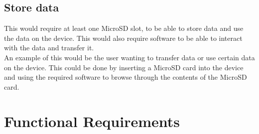 \subsection{Store data}
	This would require at least one MicroSD slot, to be able to store data and use the data on the device. This would also require software to be able to interact with the data and transfer it.\\
	An example of this would be the user wanting to transfer data or use certain data on the device. This could be done by inserting a MicroSD card into the device and using the required software to browse through the contents of the MicroSD card.


        \section{Functional Requirements}





